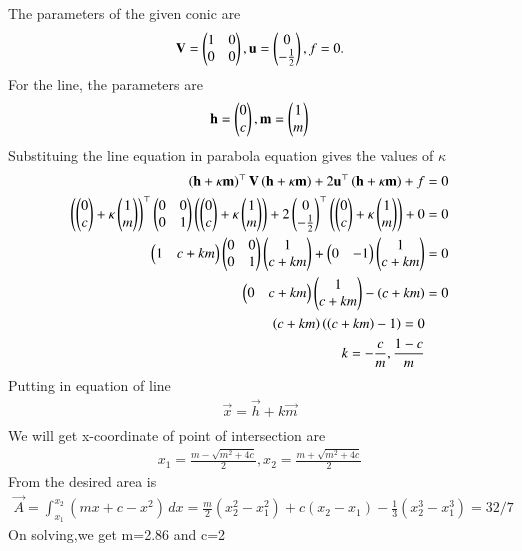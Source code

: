 \documentclass[journal]{IEEEtran}
\numberwithin{equation}{enumi}
\numberwithin{figure}{enumi}
\begin{document}
The parameters of the given conic are
\begin{align}
\mathbf{V}=\begin{pmatrix}
1 & 0\\
0 & 0
\end{pmatrix},
\mathbf{u}=\begin{pmatrix}0\\-\frac{1}{2}\end{pmatrix},
f=0.
\end{align} 
For the line, the parameters are
\begin{align}
\mathbf{h} = \begin{pmatrix}
0\\
c
\end{pmatrix},
\mathbf{m} = \begin{pmatrix}1 \\ m\end{pmatrix}
\end{align}
Substituing the line equation in parabola equation gives the values of $\kappa$
\begin{align}
\left(\mathbf{h}+\kappa\mathbf{m}\right)^\top\mathbf{V}\left(\mathbf{h}+\kappa\mathbf{m}\right) + 2\mathbf{u}^\top\left(\mathbf{h}+\kappa\mathbf{m}\right) + f &= 0\\
\left(\begin{pmatrix}0\\c\end{pmatrix}+\kappa\begin{pmatrix}1\\m\end{pmatrix}\right)^\top\begin{pmatrix}0 & 0\\0 & 1\end{pmatrix}\left(\begin{pmatrix}0\\c\end{pmatrix}+\kappa\begin{pmatrix}1\\m\end{pmatrix}\right) + 2\begin{pmatrix}0\\-\frac{1}{2}\end{pmatrix}^\top\left(\begin{pmatrix}0\\c\end{pmatrix}+\kappa\begin{pmatrix}1\\m\end{pmatrix}\right) + 0 &= 0\\
\begin{pmatrix}1&c+km\end{pmatrix}\begin{pmatrix}0&0\\0&1\end{pmatrix}\begin{pmatrix}1\\c+km\end{pmatrix}+\begin{pmatrix}0&-1\end{pmatrix}\begin{pmatrix}1\\c+km\end{pmatrix} &= 0\\
\begin{pmatrix}0&c+km\end{pmatrix}\begin{pmatrix}1\\c+km\end{pmatrix}-\left(c+km\right) &= 0\\
\left(c+km\right)\left(\left(c+km\right)-1\right)=0\\
k=-\frac{c}{m},\frac{1-c}{m}\\
\end{align}
Putting in equation of line \\
\begin{align}
\vec{x}=\vec{h}+k\vec{m}\\
\end{align}
We will get x-coordinate of point of intersection are 
\begin{align}
    x_1=\frac{m-\sqrt{m^2+4c}}{2},x_2=\frac{m+\sqrt{m^2+4c}}{2}
\end{align}
From the desired area is 
\begin{align}
\vec{A}=\int_{x_1}^{x_2} (mx+c-x^2) \,dx = \frac{m}{2}(x_2^2-x_1^2) + c(x_2-x_1) -\frac{1}{3}(x_2^3 - x_1^3) = 32/7
\end{align}
On solving,we get m=2.86 and c=2
 
\end{document}
